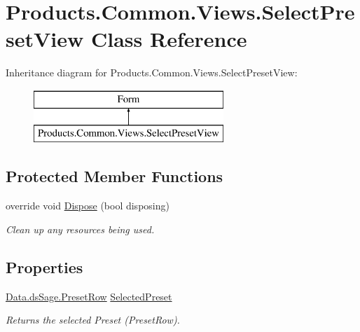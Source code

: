\hypertarget{class_products_1_1_common_1_1_views_1_1_select_preset_view}{}\section{Products.\+Common.\+Views.\+Select\+Preset\+View Class Reference}
\label{class_products_1_1_common_1_1_views_1_1_select_preset_view}
Inheritance diagram for Products.\+Common.\+Views.\+Select\+Preset\+View\+:\begin{figure}[H]
\begin{center}
\leavevmode
\includegraphics[height=2.000000cm]{class_products_1_1_common_1_1_views_1_1_select_preset_view}
\end{center}
\end{figure}
\subsection*{Protected Member Functions}
\begin{DoxyCompactItemize}
\item 
override void \hyperlink{class_products_1_1_common_1_1_views_1_1_select_preset_view_a9438e31a38e3303191738d2509965c2f}{Dispose} (bool disposing)
\begin{DoxyCompactList}\small\item\em Clean up any resources being used. \end{DoxyCompactList}\end{DoxyCompactItemize}
\subsection*{Properties}
\begin{DoxyCompactItemize}
\item 
\hyperlink{class_products_1_1_data_1_1ds_sage_1_1_preset_row}{Data.\+ds\+Sage.\+Preset\+Row} \hyperlink{class_products_1_1_common_1_1_views_1_1_select_preset_view_acbfd2a60e07e92792069c9d79f247fa5}{Selected\+Preset}
\begin{DoxyCompactList}\small\item\em Returns the selected Preset (Preset\+Row). \end{DoxyCompactList}\end{DoxyCompactItemize}


